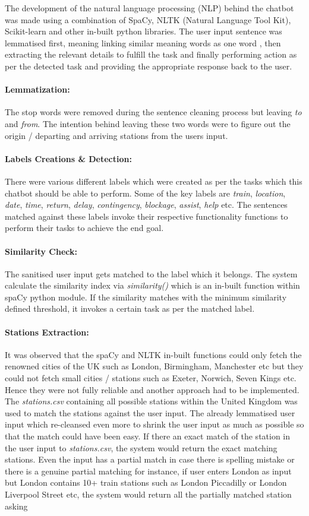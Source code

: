 The development of the natural language processing (NLP) behind the chatbot was made using a combination of SpaCy, NLTK (Natural Language Tool Kit), Scikit-learn and other in-built python libraries. The user input sentence was lemmatised first, meaning  linking similar meaning words as one word \cite{lemmatization}, then extracting the relevant details to fulfill the task and finally performing action as per the detected task and providing the appropriate response back to the user. \paragraph{Lemmatization:} The stop words were removed during the sentence cleaning process but leaving \textit{to} and \textit{from}. The intention behind leaving these two words were to figure out the origin / departing and arriving stations from the users input. \paragraph{Labels Creations \& Detection:} There were various different labels which were created as per the tasks which this chatbot should be able to perform. Some of the key labels are \textit{train}, \textit{location}, \textit{date}, \textit{time}, \textit{return}, \textit{delay}, \textit{contingency}, \textit{blockage}, \textit{assist}, \textit{help} etc. The sentences matched against these labels invoke their respective functionality functions to perform their tasks to achieve the end goal. \paragraph{Similarity Check:} The sanitised user input gets matched to the label which it belongs. The system calculate the similarity index via \textit{similarity()} which is an in-built function within spaCy python module. If the similarity matches with the minimum similarity defined threshold, it invokes a certain task as per the matched label. \paragraph{Stations Extraction: } It was observed that the spaCy and NLTK in-built functions could only fetch the renowned cities of the UK such as London, Birmingham, Manchester etc but they could not fetch small cities / stations such as Exeter, Norwich, Seven Kings etc. Hence they were not fully reliable and another approach had to be implemented. The \textit{stations.csv} containing all possible stations within the United Kingdom was used to match the stations against the user input. The already lemmatised user input which re-cleansed even more to shrink the user input as much as possible so that the match could have been easy. If there an exact match of the station in the user input to \textit{stations.csv}, the system would return the exact matching stations. Even the input has a partial match in case there is spelling mistake or there is a genuine partial matching for instance, if user enters London as input but London contains 10+ train stations such as London Piccadilly or London Liverpool Street etc, the system would return all the partially matched station asking 
